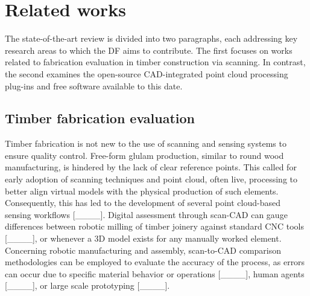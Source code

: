 \section{Related works}
The state-of-the-art review is divided into two paragraphs, each addressing key research areas to which the DF aims to contribute. The first focuses on works related to fabrication evaluation in timber construction via scanning. In contrast, the second examines the open-source CAD-integrated point cloud processing plug-ins and free software available to this date. 

\subsection{Timber fabrication evaluation}
\label{sec:rel:timber_eval}
Timber fabrication is not new to the use of scanning and sensing systems to ensure quality control.
Free-form glulam production, similar to round wood manufacturing, is hindered by the lack of clear reference points. This called for early adoption of scanning techniques and point cloud, often live, processing to better align virtual models with the physical production of such elements. Consequently, this has led to the development of several point cloud-based sensing workflows [____].
Digital assessment through scan-CAD can gauge differences between robotic milling of timber joinery against standard CNC tools [____], or whenever a 3D model exists for any manually worked element.
Concerning robotic manufacturing and assembly, scan-to-CAD comparison methodologies can be employed to evaluate the accuracy of the process, as errors can occur due to specific material behavior or operations [____], human agents [____], or large scale prototyping [____].

